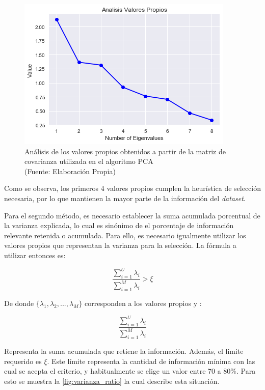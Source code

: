 \begin{figure}[ht!]
\centering
\includegraphics[width=.6\textwidth]{figures/eigenvalues.png}
\caption[Análisis de los valores propios obtenidos a partir de la matriz de covarianza]{Análisis de los valores propios obtenidos a partir de la matriz de covarianza utilizada en el algoritmo PCA  \\
{\scriptsize (Fuente: Elaboración Propia)}}
\label{fig:manifold}
\end{figure}

Como se observa, los primeros 4 valores propios cumplen la heurística de selección necesaria, por lo que mantienen la mayor parte de la información del \textit{dataset}.

Para el segundo método, es necesario establecer la suma acumulada porcentual de la varianza explicada, lo cual es sinónimo de el porcentaje de información relevante retenida o acumulada. Para ello, es necesario igualmente utilizar los valores propios que representan la varianza para la selección. La fórmula a utilizar entonces es:

\begin{equation} \frac{\sum_{i=1}^{U}\lambda_{i}}{\sum_{i=1}^{M}\lambda_{i}}  > \xi
\end{equation}

De donde $\{ \lambda_{1}, \lambda_{2}, ..., \lambda_{M}\}$ corresponden a los valores propios y :

\begin{equation}
\frac{\sum_{i=1}^{U}\lambda_{i}}{\sum_{i=1}^{M}\lambda_{i}}
\end{equation}

Representa la suma acumulada que retiene la información. Además, el limite requerido es $\xi$. Este límite representa la cantidad de información mínima con las cual se acepta el criterio, y habitualmente se elige un valor entre 70 a 80\%. Para esto se muestra la \autoref{fig:varianza_ratio} la cual describe esta situación.

